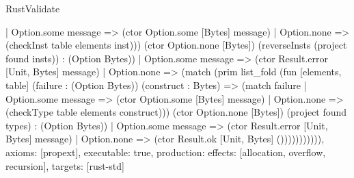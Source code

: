 \begin{lexlean}{RustValidate}
\begin{semanticmodule}
{      | Option.some message => (ctor Option.some [Bytes] message)
      | Option.none => (checkInst table elements inst))) (ctor Option.none [Bytes]) (reverseInsts (project found insts)) : (Option Bytes))
    | Option.some message => (ctor Result.error [Unit, Bytes] message)
    | Option.none => (match (prim list_fold (fun [elements, table] (failure : (Option Bytes)) (construct : Bytes) => (match failure
        | Option.some message => (ctor Option.some [Bytes] message)
        | Option.none => (checkType table elements construct))) (ctor Option.none [Bytes]) (project found types) : (Option Bytes))
      | Option.some message => (ctor Result.error [Unit, Bytes] message)
      | Option.none => (ctor Result.ok [Unit, Bytes] ())))))))))),
  axioms: [propext],
  executable: true,
  production: {effects: [allocation, overflow, recursion], targets: [rust-std]}
}
\end{semanticmodule}
\end{lexlean}
